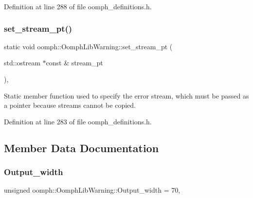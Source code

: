 Definition at line 288 of file oomph\+\_\+definitions.\+h.

\mbox{\label{classoomph_1_1OomphLibWarning_ade3b8f1484c2f91b0f2c7723ce056e93}} 
\subsubsection{\texorpdfstring{set\+\_\+stream\+\_\+pt()}{set\_stream\_pt()}}
{\footnotesize\ttfamily static void oomph\+::\+Oomph\+Lib\+Warning\+::set\+\_\+stream\+\_\+pt (\begin{DoxyParamCaption}\item[{std\+::ostream $\ast$const \&}]{stream\+\_\+pt }\end{DoxyParamCaption})\hspace{0.3cm}{\ttfamily [inline]}, {\ttfamily [static]}}



Static member function used to specify the error stream, which must be passed as a pointer because streams cannot be copied. 



Definition at line 283 of file oomph\+\_\+definitions.\+h.



\subsection{Member Data Documentation}
\mbox{\label{classoomph_1_1OomphLibWarning_a9050b8bcb8654198a681483b9c3d5e27}} 
\subsubsection{\texorpdfstring{Output\+\_\+width}{Output\_width}}
{\footnotesize\ttfamily unsigned oomph\+::\+Oomph\+Lib\+Warning\+::\+Output\+\_\+width = 70\hspace{0.3cm}{\ttfamily [static]}, {\ttfamily [private]}}



